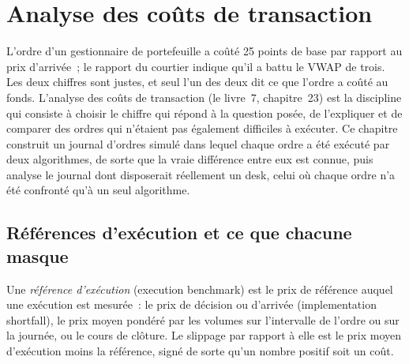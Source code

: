 \chapter{Analyse des coûts de transaction}\label{ch:mx:transaction-cost-analysis}

L'ordre d'un gestionnaire de portefeuille a coûté 25 points de base par rapport au prix d'arrivée~; le rapport du courtier indique qu'il a battu le VWAP de trois. Les deux chiffres sont justes, et
seul l'un des deux dit ce que l'ordre a coûté au fonds. L'analyse des coûts de transaction (le livre~7, chapitre~23) est la discipline qui consiste à choisir le chiffre
qui répond à la question posée, de l'expliquer et de comparer des ordres qui n'étaient pas également difficiles à exécuter. Ce chapitre construit un journal d'ordres simulé dans
lequel chaque ordre a été exécuté par deux algorithmes, de sorte que la vraie différence entre eux est connue, puis analyse le journal dont disposerait réellement
un desk, celui où chaque ordre n'a été confronté qu'à un seul algorithme.

\section{Références d'exécution et ce que chacune masque}

\begin{definition}\label{def:mx:transaction-cost-analysis:benchmark}
Une \emph{référence d'exécution} (execution benchmark) est le prix de référence auquel une exécution est mesurée~: le prix de décision ou d'arrivée
(implementation shortfall), le prix moyen pondéré par les volumes sur l'intervalle de l'ordre ou sur la journée, ou le cours de clôture. Le slippage par rapport à elle est le prix
moyen d'exécution moins la référence, signé de sorte qu'un nombre positif soit un coût.
\end{definition}

